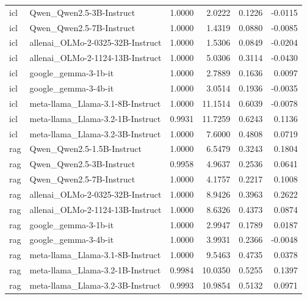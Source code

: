 \begin{tabular}{llrrrr}
icl & Qwen_Qwen2.5-3B-Instruct & 1.0000 & 2.0222 & 0.1226 & -0.0115 \\
icl & Qwen_Qwen2.5-7B-Instruct & 1.0000 & 1.4319 & 0.0880 & -0.0085 \\
icl & allenai_OLMo-2-0325-32B-Instruct & 1.0000 & 1.5306 & 0.0849 & -0.0204 \\
icl & allenai_OLMo-2-1124-13B-Instruct & 1.0000 & 5.0306 & 0.3114 & -0.0430 \\
icl & google_gemma-3-1b-it & 1.0000 & 2.7889 & 0.1636 & 0.0097 \\
icl & google_gemma-3-4b-it & 1.0000 & 3.0514 & 0.1936 & -0.0035 \\
icl & meta-llama_Llama-3.1-8B-Instruct & 1.0000 & 11.1514 & 0.6039 & -0.0078 \\
icl & meta-llama_Llama-3.2-1B-Instruct & 0.9931 & 11.7259 & 0.6243 & 0.1136 \\
icl & meta-llama_Llama-3.2-3B-Instruct & 1.0000 & 7.6000 & 0.4808 & 0.0719 \\
rag & Qwen_Qwen2.5-1.5B-Instruct & 1.0000 & 6.5479 & 0.3243 & 0.1804 \\
rag & Qwen_Qwen2.5-3B-Instruct & 0.9958 & 4.9637 & 0.2536 & 0.0641 \\
rag & Qwen_Qwen2.5-7B-Instruct & 1.0000 & 4.1757 & 0.2217 & 0.1008 \\
rag & allenai_OLMo-2-0325-32B-Instruct & 1.0000 & 8.9426 & 0.3963 & 0.2622 \\
rag & allenai_OLMo-2-1124-13B-Instruct & 1.0000 & 8.6326 & 0.4373 & 0.0874 \\
rag & google_gemma-3-1b-it & 1.0000 & 2.9947 & 0.1789 & 0.0187 \\
rag & google_gemma-3-4b-it & 1.0000 & 3.9931 & 0.2366 & -0.0048 \\
rag & meta-llama_Llama-3.1-8B-Instruct & 1.0000 & 9.5463 & 0.4735 & 0.0378 \\
rag & meta-llama_Llama-3.2-1B-Instruct & 0.9984 & 10.0350 & 0.5255 & 0.1397 \\
rag & meta-llama_Llama-3.2-3B-Instruct & 0.9993 & 10.9854 & 0.5132 & 0.0971 \\
\bottomrule
\end{tabular}
